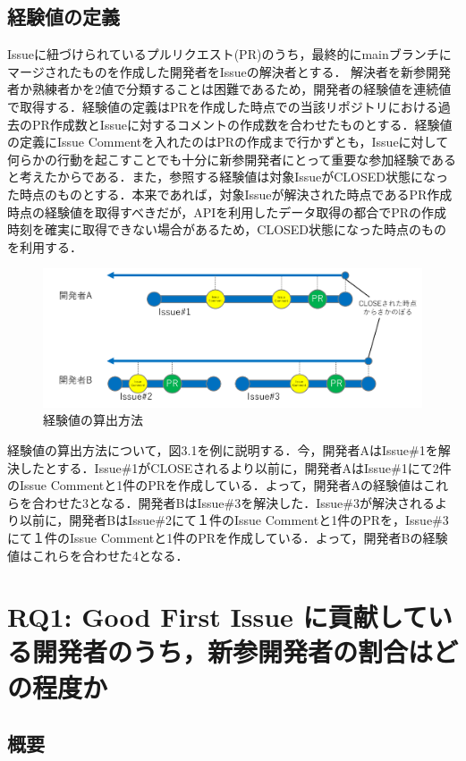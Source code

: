 \documentclass[11pt]{jreport}
\newcommand{\RQOne}{Good First Issue に貢献している開発者のうち，新参開発者の割合はどの程度か}
\begin{document}
\subsection{経験値の定義}
Issueに紐づけられているプルリクエスト(PR)のうち，最終的にmainブランチにマージされたものを作成した開発者をIssueの解決者とする．
解決者を新参開発者か熟練者かを2値で分類することは困難であるため，開発者の経験値を連続値で取得する．経験値の定義はPRを作成した時点での当該リポジトリにおける過去のPR作成数とIssueに対するコメントの作成数を合わせたものとする．経験値の定義にIssue Commentを入れたのはPRの作成まで行かずとも，Issueに対して何らかの行動を起こすことでも十分に新参開発者にとって重要な参加経験であると考えたからである．また，参照する経験値は対象IssueがCLOSED状態になった時点のものとする．本来であれば，対象Issueが解決された時点であるPR作成時点の経験値を取得すべきだが，APIを利用したデータ取得の都合でPRの作成時刻を確実に取得できない場合があるため，CLOSED状態になった時点のものを利用する．

\begin{figure}[H]
\centerline{\includegraphics[width=0.9\linewidth]{@BSthesis2024_Nakai/BSthesis2024_Nakai_fig/exp.png}}
\caption{経験値の算出方法}
\label{fig:milestone}
\end{figure}

経験値の算出方法について，図3.1を例に説明する．今，開発者AはIssue\#1を解決したとする．Issue\#1がCLOSEされるより以前に，開発者AはIssue\#1にて2件のIssue Commentと1件のPRを作成している．よって，開発者Aの経験値はこれらを合わせた3となる．開発者BはIssue\#3を解決した．Issue\#3が解決されるより以前に，開発者BはIssue\#2にて１件のIssue Commentと1件のPRを，Issue\#3にて１件のIssue Commentと1件のPRを作成している．よって，開発者Bの経験値はこれらを合わせた4となる．

\section{RQ1: \RQOne}

\subsection{概要}
\end{document}
